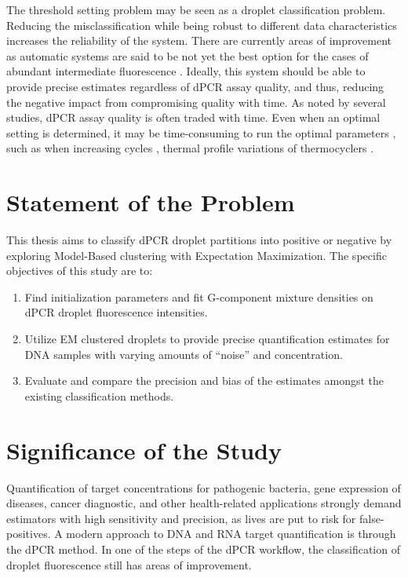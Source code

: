 The threshold setting problem may be seen as a droplet classification problem. Reducing the misclassification while being robust to different data characteristics increases the reliability of the system. There are currently areas of improvement as automatic systems are said to be not yet the best option for the cases of abundant intermediate fluorescence \cite{Demeke2018}. Ideally, this system should be able to provide precise estimates regardless of dPCR assay quality, and thus, reducing the negative impact from compromising quality with time. As noted by several studies, dPCR assay quality is often traded with time. Even when an optimal setting is determined, it may be time-consuming to run the optimal parameters \cite{Witte2016}, such as when increasing cycles \cite{Lievens2016}, thermal profile variations of thermocyclers \cite{Young2008}. 



\section{Statement of the Problem}
\label{sec:statementprob}

This thesis aims to classify dPCR droplet partitions into positive or negative by exploring Model-Based clustering with Expectation Maximization. The specific objectives of this study are to:
\begin{enumerate}
    \item Find initialization parameters and fit G-component mixture densities on dPCR droplet fluorescence intensities.
    \item Utilize EM clustered droplets to provide precise quantification estimates for DNA samples with varying amounts of “noise” and concentration.
    \item Evaluate and compare the precision and bias of the estimates amongst the existing classification methods. 
\end{enumerate}

\section{Significance of the Study}
\label{sec:significancestudy}
Quantification of target concentrations for pathogenic bacteria, gene expression of diseases, cancer diagnostic, and other health-related applications strongly demand estimators with high sensitivity and precision, as lives are put to risk for false-positives. A modern approach to DNA and RNA target quantification is through the dPCR method. In one of the steps of the dPCR workflow, the classification of droplet fluorescence still has areas of improvement. 

